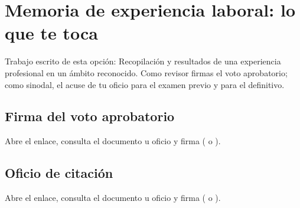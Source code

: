 \section{Memoria de experiencia laboral: lo que te toca}
Trabajo escrito de esta opción: Recopilación y resultados de una experiencia profesional en un ámbito reconocido. Como revisor firmas el voto aprobatorio; como sinodal, el acuse de tu oficio para el examen previo y para el definitivo.
\subsection{Firma del voto aprobatorio}
Abre el enlace, consulta el documento u oficio y firma ( o ).
\subsection{Oficio de citación}
Abre el enlace, consulta el documento u oficio y firma ( o ).
